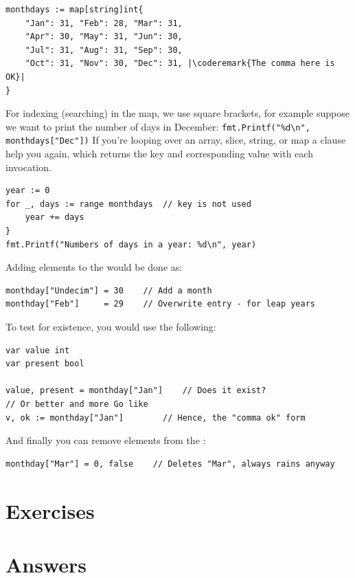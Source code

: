 \begin{lstlisting}
monthdays := map[string]int{
	"Jan": 31, "Feb": 28, "Mar": 31, 
	"Apr": 30, "May": 31, "Jun": 30, 
	"Jul": 31, "Aug": 31, "Sep": 30, 
	"Oct": 31, "Nov": 30, "Dec": 31, |\coderemark{The comma here is OK}|
}		    
\end{lstlisting}
For indexing (searching) in the map, we use square brackets, for example
suppose we want to print the
number of days in December: \lstinline{fmt.Printf("%d\n", monthdays["Dec"])}\newline
If you're looping over an array, slice, string, or map a
clause help you again, which returns the key and corresponding value
with each invocation.
\begin{lstlisting}
year := 0
for _, days := range monthdays  // key is not used
    year += days
}
fmt.Printf("Numbers of days in a year: %d\n", year)
\end{lstlisting}
Adding elements to the  would be done as:
\begin{lstlisting}
monthday["Undecim"] = 30	// Add a month
monthday["Feb"]     = 29	// Overwrite entry - for leap years
\end{lstlisting}
To test for existence, you would use the
following\cite{go_course_day2}:
\begin{lstlisting}
var value int
var present bool

value, present = monthday["Jan"]	// Does it exist?
// Or better and more Go like
v, ok := monthday["Jan"]		// Hence, the "comma ok" form
\end{lstlisting}
And finally you can remove elements from the :
\begin{lstlisting}
monthday["Mar"] = 0, false    // Deletes "Mar", always rains anyway
\end{lstlisting}

\section{Exercises}







\cleardoublepage
\section{Answers}
\shipoutAnswer

